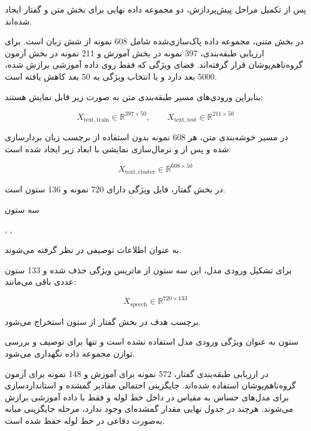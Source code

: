 پس از تکمیل مراحل پیش‌پردازش، دو مجموعه داده نهایی برای بخش متن و گفتار ایجاد شده‌اند.

در بخش متنی، مجموعه داده پاک‌سازی‌شده شامل 608 نمونه از شش زبان است. برای ارزیابی طبقه‌بندی، 397 نمونه در بخش آموزش و 211 نمونه در بخش آزمون گروه‌ناهم‌پوشان قرار گرفته‌اند. فضای ویژگی
که فقط روی داده آموزشی برازش شده، 5000 بعد دارد و با انتخاب ویژگی
به 50 بعد کاهش یافته است.

بنابراین ورودی‌های مسیر طبقه‌بندی متن به صورت زیر قابل نمایش هستند:

\begin{equation}
X_{\mathrm{text,train}}
\in
\mathbb{R}^{397\times50},
\qquad
X_{\mathrm{text,test}}
\in
\mathbb{R}^{211\times50}
\end{equation}

در مسیر خوشه‌بندی متن، هر 608 نمونه بدون استفاده از برچسب زبان بردارسازی شده و پس از
و نرمال‌سازی
نمایشی با ابعاد زیر ایجاد شده است:

\begin{equation}
X_{\mathrm{text,cluster}}
\in
\mathbb{R}^{608\times50}
\end{equation}

در بخش گفتار، فایل ویژگی دارای 720 نمونه و 136 ستون است.

سه ستون

\begin{center}
,
\quad
{},
\quad
{}
\end{center}

به عنوان اطلاعات توصیفی در نظر گرفته می‌شوند.

برای تشکیل ورودی مدل، این سه ستون از ماتریس ویژگی حذف شده و 133 ستون عددی باقی می‌مانند:

\begin{equation}
X_{\mathrm{speech}}
\in
\mathbb{R}^{720\times133}
\end{equation}

برچسب هدف در بخش گفتار از ستون
استخراج می‌شود.

ستون
به عنوان ویژگی ورودی مدل استفاده نشده است و تنها برای توصیف و بررسی توازن مجموعه داده نگهداری می‌شود.

در ارزیابی طبقه‌بندی گفتار، 572 نمونه برای آموزش و 148 نمونه برای آزمون گروه‌ناهم‌پوشان استفاده شده‌اند. جایگزینی احتمالی مقادیر گمشده و استانداردسازی برای مدل‌های حساس به مقیاس در داخل خط لوله و فقط با داده آموزشی برازش می‌شوند. هرچند در جدول نهایی مقدار گمشده‌ای وجود ندارد، مرحله جایگزینی میانه به‌صورت دفاعی در خط لوله حفظ شده است.

